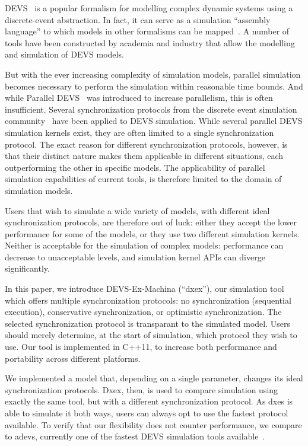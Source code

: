 \textsf{DEVS}~\cite{ClassicDEVS} is a popular formalism for modelling complex dynamic systems using a discrete-event abstraction.
In fact, it can serve as a simulation ``assembly language'' to which models in other formalisms can be mapped~\cite{DEVSbase}.
A number of tools have been constructed by academia and industry that allow the modelling and simulation of \textsf{DEVS} models.

But with the ever increasing complexity of simulation models, parallel simulation becomes necessary to perform the simulation within reasonable time bounds.
And while \textsf{Parallel DEVS}~\cite{ParallelDEVS} was introduced to increase parallelism, this is often insufficient.
Several synchronization protocols from the discrete event simulation community~\cite{FujimotoBook} have been applied to \textsf{DEVS} simulation.
While several parallel \textsf{DEVS} simulation kernels exist, they are often limited to a single synchronization protocol.
The exact reason for different synchronization protocols, however, is that their distinct nature makes them applicable in different situations, each outperforming the other in specific models.
The applicability of parallel simulation capabilities of current tools, is therefore limited to the domain of simulation models.

Users that wish to simulate a wide variety of models, with different ideal synchronization protocols, are therefore out of luck:
either they accept the lower performance for some of the models, or they use two different simulation kernels.
Neither is acceptable for the simulation of complex models: performance can decrease to unacceptable levels, and simulation kernel APIs can diverge significantly.

In this paper, we introduce DEVS-Ex-Machina (``dxex''), our simulation tool which offers multiple synchronization protocols: no synchronization (sequential execution), conservative synchronization, or optimistic synchronization.
The selected synchronization protocol is transparant to the simulated model.
Users should merely determine, at the start of simulation, which protocol they wish to use.
Our tool is implemented in C++11, to increase both performance and portability across different platforms.

We implemented a model that, depending on a single parameter, changes its ideal synchronization protocols.
Dxex, then, is used to compare simulation using exactly the same tool, but with a different synchronization protocol.
As dxes is able to simulate it both ways, users can always opt to use the fastest protocol available.
To verify that our flexibility does not counter performance, we compare to adevs, currently one of the fastest \textsf{DEVS} simulation tools available~\cite{PythonPDEVS,DEVSSurvey}.

